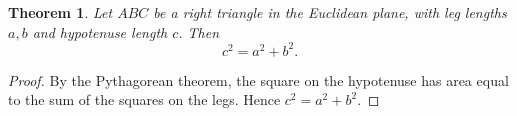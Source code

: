 \documentclass{article}
\newtheorem{theorem}{Theorem}
\begin{document}
\begin{theorem}\label{thm:euclidean-pythagoras-clean}
Let $ABC$ be a right triangle in the Euclidean plane, with leg lengths $a,b$ and hypotenuse length $c$. Then
\[
c^2=a^2+b^2.
\]
\end{theorem}
\begin{proof}
By the Pythagorean theorem, the square on the hypotenuse has area equal to the sum of the squares on the legs. Hence $c^2=a^2+b^2$.
\end{proof}
\end{document}
